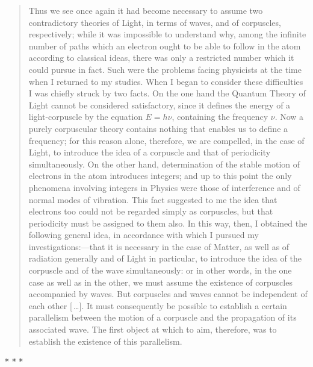 \begin{quotation}
Thus we see once again it had become necessary to assume two
contradictory theories of Light, in terms of waves, and of corpuscles,
respectively; while it was impossible to understand why, among the
infinite number of paths which an electron ought to be able to follow in
the atom according to classical ideas, there was only a restricted
number which it could pursue in fact. Such were the problems facing
physicists at the time when I returned to my studies. When I began to
consider these difficulties I was chiefly struck by two facts. On the
one hand the Quantum Theory of Light cannot be considered satisfactory,
since it defines the energy of a light-corpuscle by the equation
$E = h\nu$, containing the frequency $\nu$. Now a purely
corpuscular theory contains nothing that enables us to define a
frequency; for this reason alone, therefore, we are compelled, in the
case of Light, to introduce the idea of a corpuscle and that of
periodicity simultaneously. On the other hand, determination of the
stable motion of electrons in the atom introduces integers; and up to
this point the only phenomena involving integers in Physics were those
of interference and of normal modes of vibration. This fact suggested to
me the idea that electrons too could not be regarded simply as
corpuscles, but that periodicity must be assigned to them also. In this
way, then, I obtained the following general idea, in accordance with
which I pursued my investigations:---that it is necessary in the case of
Matter, as well as of radiation generally and of Light in particular, to
introduce the idea of the corpuscle and of the wave simultaneously: or
in other words, in the one case as well as in the other, we must assume
the existence of corpuscles accompanied by waves. But corpuscles and
waves cannot be independent of each other [\,\ldots]. It must consequently be
possible to establish a certain parallelism between the motion of a
corpuscle and the propagation of its associated wave. The first object
at which to aim, therefore, was to establish the existence of this
parallelism.

\end{quotation}

\begin{center}
* * *
\end{center}

